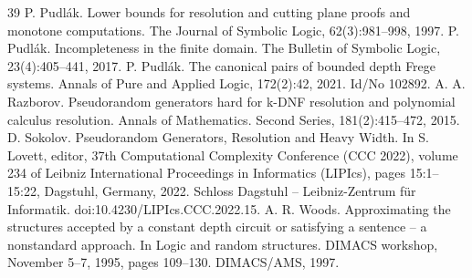 \begin{thebibliography}{39}
 P. Pudlák. Lower bounds for resolution and cutting plane proofs and monotone computations. The Journal of Symbolic Logic, 62(3):981–998, 1997.
 P. Pudlák. Incompleteness in the finite domain. The Bulletin of Symbolic Logic, 23(4):405–441, 2017.
 P. Pudlák. The canonical pairs of bounded depth Frege systems. Annals of Pure and Applied Logic, 172(2):42, 2021. Id/No 102892.
 A. A. Razborov. Pseudorandom generators hard for k-DNF resolution and polynomial calculus resolution. Annals of Mathematics. Second Series, 181(2):415–472, 2015.
 D. Sokolov. Pseudorandom Generators, Resolution and Heavy Width. In S. Lovett, editor, 37th Computational Complexity Conference (CCC 2022), volume 234 of Leibniz International Proceedings in Informatics (LIPIcs), pages 15:1–15:22, Dagstuhl, Germany, 2022. Schloss Dagstuhl – Leibniz-Zentrum für Informatik. doi:10.4230/LIPIcs.CCC.2022.15.
 A. R. Woods. Approximating the structures accepted by a constant depth circuit or satisfying a sentence – a nonstandard approach. In Logic and random structures. DIMACS workshop, November 5–7, 1995, pages 109–130. DIMACS/AMS, 1997.
\end{thebibliography}
